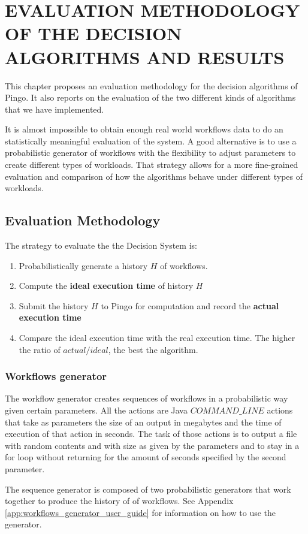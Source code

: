 \chapter{EVALUATION METHODOLOGY OF THE DECISION ALGORITHMS AND RESULTS}
\label{chap:evaluation}
This chapter proposes an evaluation methodology for the decision algorithms of Pingo.  It also reports on the evaluation of the two different kinds of algorithms that we have implemented.

It is almost impossible to obtain enough real world workflows data to do an statistically meaningful evaluation of the system. A good alternative is to use a probabilistic generator of workflows with the flexibility to adjust parameters to create different types of workloads.  That strategy allows for a more fine-grained evaluation and comparison of how the algorithms behave under different types of workloads.

\section{Evaluation Methodology}
The strategy to evaluate the the Decision System is:
\begin{enumerate}
\item Probabilistically generate a history $H$ of workflows.
\item Compute the \textbf{ideal execution time} of history $H$
\item Submit the history $H$ to Pingo for computation and record the \textbf{actual execution time}
\item Compare the ideal execution time with the real execution time.  The higher the ratio of $actual/ideal$, the best the algorithm.
\end{enumerate}
\subsection{Workflows generator}
The workflow generator creates sequences of workflows in a probabilistic way given certain parameters. All the actions are Java $COMMAND\_LINE$ actions that take as parameters the size of an output in megabytes and the time of execution of that action in seconds.  The task of those actions is to output a file with random contents and with size as given by the parameters and to stay in a for loop without returning for the amount of seconds specified by the second parameter.

The sequence generator is composed of two probabilistic generators that work together to produce the history of of workflows.  See Appendix \ref{app:workflows_generator_user_guide} for information on how to use the generator.  

